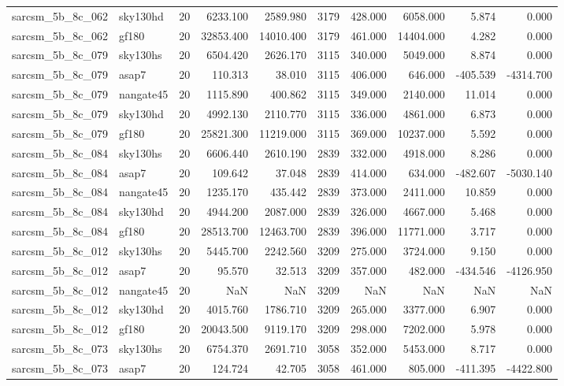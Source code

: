 \begin{tabular}{llrrrrrrrr}
sarcsm\_5b\_8c\_062 & sky130hd & 20 & 6233.100 & 2589.980 & 3179 & 428.000 & 6058.000 & 5.874 & 0.000 \\
sarcsm\_5b\_8c\_062 & gf180 & 20 & 32853.400 & 14010.400 & 3179 & 461.000 & 14404.000 & 4.282 & 0.000 \\
sarcsm\_5b\_8c\_079 & sky130hs & 20 & 6504.420 & 2626.170 & 3115 & 340.000 & 5049.000 & 8.874 & 0.000 \\
sarcsm\_5b\_8c\_079 & asap7 & 20 & 110.313 & 38.010 & 3115 & 406.000 & 646.000 & -405.539 & -4314.700 \\
sarcsm\_5b\_8c\_079 & nangate45 & 20 & 1115.890 & 400.862 & 3115 & 349.000 & 2140.000 & 11.014 & 0.000 \\
sarcsm\_5b\_8c\_079 & sky130hd & 20 & 4992.130 & 2110.770 & 3115 & 336.000 & 4861.000 & 6.873 & 0.000 \\
sarcsm\_5b\_8c\_079 & gf180 & 20 & 25821.300 & 11219.000 & 3115 & 369.000 & 10237.000 & 5.592 & 0.000 \\
sarcsm\_5b\_8c\_084 & sky130hs & 20 & 6606.440 & 2610.190 & 2839 & 332.000 & 4918.000 & 8.286 & 0.000 \\
sarcsm\_5b\_8c\_084 & asap7 & 20 & 109.642 & 37.048 & 2839 & 414.000 & 634.000 & -482.607 & -5030.140 \\
sarcsm\_5b\_8c\_084 & nangate45 & 20 & 1235.170 & 435.442 & 2839 & 373.000 & 2411.000 & 10.859 & 0.000 \\
sarcsm\_5b\_8c\_084 & sky130hd & 20 & 4944.200 & 2087.000 & 2839 & 326.000 & 4667.000 & 5.468 & 0.000 \\
sarcsm\_5b\_8c\_084 & gf180 & 20 & 28513.700 & 12463.700 & 2839 & 396.000 & 11771.000 & 3.717 & 0.000 \\
sarcsm\_5b\_8c\_012 & sky130hs & 20 & 5445.700 & 2242.560 & 3209 & 275.000 & 3724.000 & 9.150 & 0.000 \\
sarcsm\_5b\_8c\_012 & asap7 & 20 & 95.570 & 32.513 & 3209 & 357.000 & 482.000 & -434.546 & -4126.950 \\
sarcsm\_5b\_8c\_012 & nangate45 & 20 & NaN & NaN & 3209 & NaN & NaN & NaN & NaN \\
sarcsm\_5b\_8c\_012 & sky130hd & 20 & 4015.760 & 1786.710 & 3209 & 265.000 & 3377.000 & 6.907 & 0.000 \\
sarcsm\_5b\_8c\_012 & gf180 & 20 & 20043.500 & 9119.170 & 3209 & 298.000 & 7202.000 & 5.978 & 0.000 \\
sarcsm\_5b\_8c\_073 & sky130hs & 20 & 6754.370 & 2691.710 & 3058 & 352.000 & 5453.000 & 8.717 & 0.000 \\
sarcsm\_5b\_8c\_073 & asap7 & 20 & 124.724 & 42.705 & 3058 & 461.000 & 805.000 & -411.395 & -4422.800 \\

\end{tabular}
